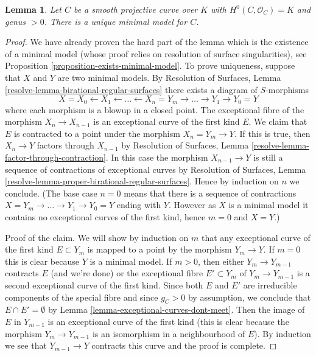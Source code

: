 \documentclass{stacks-project}
\theoremstyle{plain}
\newtheorem{lemma}[subsection]{Lemma}
\theoremstyle{definition}
\theoremstyle{remark}
\numberwithin{equation}{subsection}
\begin{document}
\begin{lemma}
\label{lemma-minimal-model-unique}
Let $C$ be a smooth projective curve over $K$ with
$H^0(C, \mathcal{O}_C) = K$ and genus $> 0$.
There is a unique minimal model for $C$.
\end{lemma}

\begin{proof}
We have already proven the hard part of the lemma which is the existence
of a minimal model (whose proof relies on
resolution of surface singularities), see
Proposition \ref{proposition-exists-minimal-model}.
To prove uniqueness, suppose that $X$ and $Y$ are two
minimal models. By
Resolution of Surfaces, Lemma \ref{resolve-lemma-birational-regular-surfaces}
there exists a diagram of $S$-morphisms
$$
X = X_0 \leftarrow X_1 \leftarrow \ldots \leftarrow X_n = Y_m
\to \ldots \to Y_1 \to Y_0 = Y
$$
where each morphism is a blowup in a closed point. The
exceptional fibre of the morphism $X_n \to X_{n - 1}$ is an
exceptional curve of the first kind $E$. We claim that $E$ is
contracted to a point under the morphism $X_n = Y_m \to Y$.
If this is true, then $X_n \to Y$ factors through $X_{n - 1}$ by
Resolution of Surfaces, Lemma \ref{resolve-lemma-factor-through-contraction}.
In this case the morphism $X_{n - 1} \to Y$ is still a sequence of
contractions of exceptional curves by
Resolution of Surfaces, Lemma
\ref{resolve-lemma-proper-birational-regular-surfaces}.
Hence by induction on $n$ we conclude. (The base case $n = 0$ means
that there is a sequence of contractions
$X = Y_m \to \ldots \to Y_1 \to Y_0 = Y$
ending with $Y$. However as $X$ is a minimal model it contains
no exceptional curves of the first kind, hence $m = 0$ and $X = Y$.)

\medskip\noindent
Proof of the claim. We will show by induction on $m$ that any exceptional
curve of the first kind $E \subset Y_m$ is mapped to a point
by the morphism $Y_m \to Y$. If $m = 0$ this is clear because
$Y$ is a minimal model. If $m > 0$, then either
$Y_m \to Y_{m - 1}$ contracts $E$ (and we're done) or
the exceptional fibre $E' \subset Y_m$ of $Y_m \to Y_{m - 1}$
is a second exceptional curve of the first kind.
Since both $E$ and $E'$ are irreducible components of the special
fibre and since $g_C > 0$ by assumption, we conclude that
$E \cap E' = \emptyset$ by
Lemma \ref{lemma-exceptional-curves-dont-meet}.
Then the image of $E$ in $Y_{m - 1}$ is an exceptional
curve of the first kind (this is clear because the morphism
$Y_m \to Y_{m - 1}$ is an isomorphism in a neighbourhood of $E$).
By induction we see that $Y_{m - 1} \to Y$ contracts this curve
and the proof is complete.
\end{proof}
\end{document}
